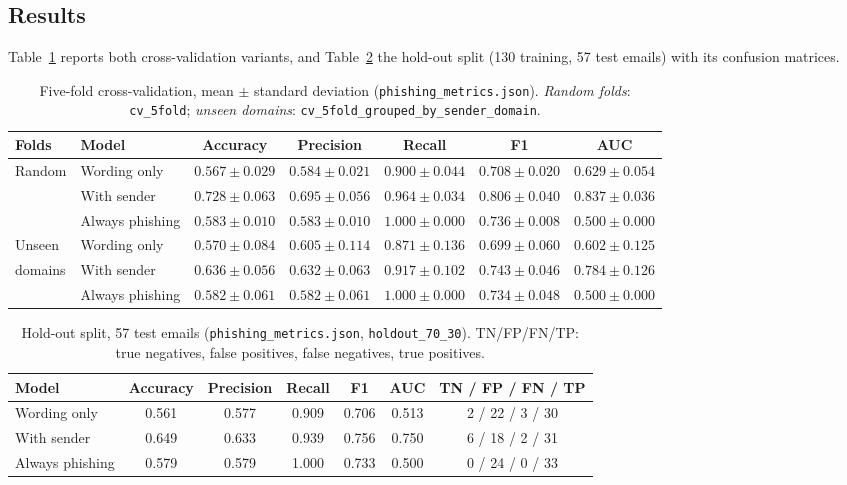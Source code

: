 \subsection{Results}

Table~\ref{tab:phish-cv} reports both cross-validation variants, and Table~\ref{tab:phish} the hold-out split (130 training, 57 test emails) with its confusion matrices.

\begin{table}[htbp]
\centering
\caption[Five-fold cross-validation of the phishing classifiers]{Five-fold cross-validation, mean $\pm$ standard deviation (\texttt{phishing\_metrics.json}). \emph{Random folds}: \texttt{cv\_5fold}; \emph{unseen domains}: \texttt{cv\_5fold\_grouped\_by\_sender\_domain}.}
\label{tab:phish-cv}
\scriptsize
\setlength{\tabcolsep}{4pt}
\begin{tabular}{llccccc}
\toprule
Folds & Model & Accuracy & Precision & Recall & F1 & AUC \\
\midrule
Random & Wording only & $0.567 \pm 0.029$ & $0.584 \pm 0.021$ & $0.900 \pm 0.044$ & $0.708 \pm 0.020$ & $0.629 \pm 0.054$ \\
 & With sender & $0.728 \pm 0.063$ & $0.695 \pm 0.056$ & $0.964 \pm 0.034$ & $0.806 \pm 0.040$ & $0.837 \pm 0.036$ \\
 & Always phishing & $0.583 \pm 0.010$ & $0.583 \pm 0.010$ & $1.000 \pm 0.000$ & $0.736 \pm 0.008$ & $0.500 \pm 0.000$ \\
\midrule
Unseen & Wording only & $0.570 \pm 0.084$ & $0.605 \pm 0.114$ & $0.871 \pm 0.136$ & $0.699 \pm 0.060$ & $0.602 \pm 0.125$ \\
domains & With sender & $0.636 \pm 0.056$ & $0.632 \pm 0.063$ & $0.917 \pm 0.102$ & $0.743 \pm 0.046$ & $0.784 \pm 0.126$ \\
 & Always phishing & $0.582 \pm 0.061$ & $0.582 \pm 0.061$ & $1.000 \pm 0.000$ & $0.734 \pm 0.048$ & $0.500 \pm 0.000$ \\
\bottomrule
\end{tabular}
\end{table}

\begin{table}[htbp]
\centering
\caption{Hold-out split, 57 test emails (\texttt{phishing\_metrics.json}, \texttt{holdout\_70\_30}). TN/FP/FN/TP: true negatives, false positives, false negatives, true positives.}
\label{tab:phish}
\scriptsize
\begin{tabular}{lcccccc}
\toprule
Model & Accuracy & Precision & Recall & F1 & AUC & TN / FP / FN / TP \\
\midrule
Wording only & 0.561 & 0.577 & 0.909 & 0.706 & 0.513 & 2 / 22 / 3 / 30 \\
With sender & 0.649 & 0.633 & 0.939 & 0.756 & 0.750 & 6 / 18 / 2 / 31 \\
Always phishing & 0.579 & 0.579 & 1.000 & 0.733 & 0.500 & 0 / 24 / 0 / 33 \\
\bottomrule
\end{tabular}
\end{table}

